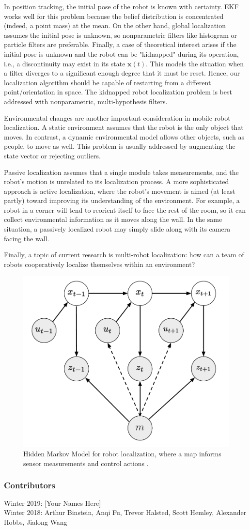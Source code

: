 \documentclass[twoside]{article}
\begin{document}
In position tracking, the initial pose of the robot is known with certainty. EKF works well for this problem because the belief distribution is concentrated (indeed, a point mass) at the mean. On the other hand, global localization assumes the initial pose is unknown, so nonparametric filters like histogram or particle filters are preferable. Finally, a case of theoretical interest arises if the initial pose is unknown and the robot can be "kidnapped" during its operation, i.e., a discontinuity may exist in its state $\mathbf{x}(t)$. This models the situation when a filter diverges to a significant enough degree that it must be reset. Hence, our localization algorithm should be capable of restarting from a different point/orientation in space. The kidnapped robot localization problem is best addressed with nonparametric, multi-hypothesis filters.

Environmental changes are another important consideration in mobile robot localization. A static environment assumes that the robot is the only object that moves. In contrast, a dynamic environmental model allows other objects, such as people, to move as well. This problem is usually addressed by augmenting the state vector or rejecting outliers.

Passive localization assumes that a single module takes measurements, and the robot's motion is unrelated to its localization process. A more sophisticated approach is active localization, where the robot's movement is aimed (at least partly) toward improving its understanding of the environment. For example, a robot in a corner will tend to reorient itself to face the rest of the room, so it can collect environmental information as it moves along the wall. In the same situation, a passively localized robot may simply slide along with its camera facing the wall.

Finally, a topic of current research is multi-robot localization: how can a team of robots cooperatively localize themselves within an environment?

\begin{figure}[H]
\centering
\includegraphics[width=0.45\linewidth]{HMM_w_map.png}
\caption{Hidden Markov Model for robot localization, where a map informs sensor measurements and control actions \cite{Xmisc}.}
\label{fig:HMM_with_map}
\end{figure}

\printbibliography

\subsubsection*{Contributors}
Winter 2019: [Your Names Here] \\
Winter 2018: Arthur Binstein, Anqi Fu, Trevor Halsted, Scott Hemley, Alexander Hobbs, Jialong Wang
\end{document}
